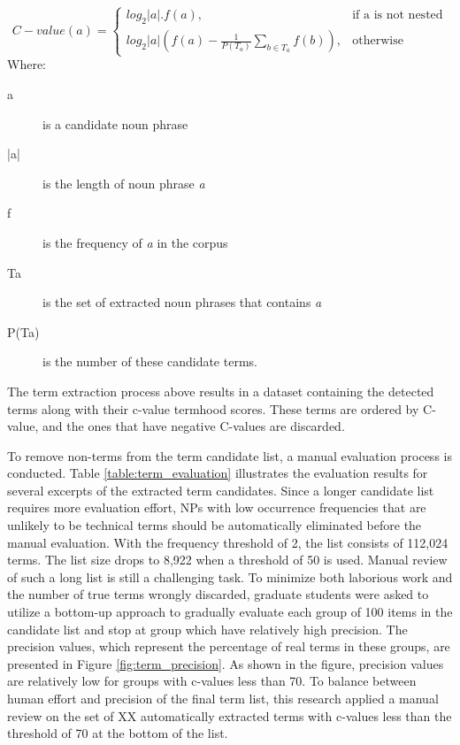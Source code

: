 \documentclass[Journal, BackFigs, DoubleSpace]{ascelike} %
\begin{document}
\begin{enumerate} [label=\roman*]
	\begin{equation}
	C-value(a)=
	\begin{cases}
	log_2|a|.f(a), & \text{if a is not nested} \\
	log_2|a|(f(a)-\frac{1}{P(T_a)}\sum_{b\in T_a} f(b)), & \text{otherwise}
	\end{cases}
	\label{eq:cvalue}
	\end{equation}
	Where:
	\begin{description}
		\item[a] is a candidate noun phrase
		\item[|a|] is the length of noun phrase \textit{a}
		\item[f] is the frequency of \textit{a} in the corpus
		\item[Ta] is the set of extracted noun phrases that contains \textit{a}
		\item[P(Ta)] is the number of these candidate terms.
	\end{description}
\end{enumerate}
%
\par
The term extraction process above results in a dataset containing the detected terms along with their c-value termhood scores. These terms are ordered by C-value, and the ones that have negative C-values are discarded. %
\par
To remove non-terms from the term candidate list, a manual evaluation process is conducted. Table \ref{table:term_evaluation} illustrates the evaluation results for several excerpts of the extracted term candidates. Since a longer candidate list requires more evaluation effort, NPs with low occurrence frequencies that are unlikely to be technical terms should be automatically eliminated before the manual evaluation. With the frequency threshold of 2, the list consists of 112,024  terms. The list size drops to 8,922 when a threshold of 50 is used. Manual review of such a long list is still a challenging task. To minimize both laborious work and the number of true terms wrongly discarded, graduate students were asked to utilize a bottom-up approach to gradually evaluate each group of 100 items in the candidate list and stop at group which have relatively high precision. The precision values, which represent the percentage of real terms in these groups, are presented in Figure \ref{fig:term_precision}. As shown in the figure, precision values are relatively low for groups with c-values less than 70. To balance between human effort and precision of the final term list, this research applied a manual review on the set of XX automatically extracted terms with c-values less than the threshold of 70 at the bottom of the list.
\end{document}

